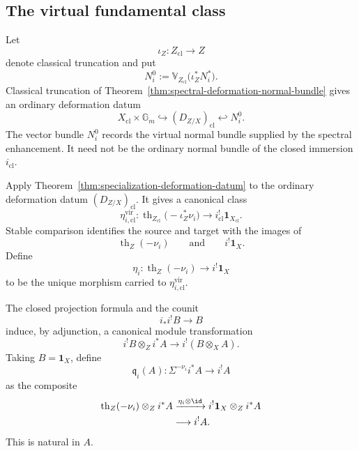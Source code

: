 \subsection{The virtual fundamental class}

Let
\[
    \iota_Z:Z_{\mathrm{cl}}\longrightarrow Z
\]
denote classical truncation and put
\[
    N_i^0
    :=
    \mathbb V_{Z_{\mathrm{cl}}}
    \bigl(
      \iota_Z^*N_i^*
    \bigr).
\]
Classical truncation of
Theorem~\ref{thm:spectral-deformation-normal-bundle} gives an ordinary
deformation datum
\[
    X_{\mathrm{cl}}\times\mathbb G_m
    \hookrightarrow
    (D_{Z/X})_{\mathrm{cl}}
    \hookleftarrow
    N_i^0.
\]
The vector bundle \(N_i^0\) records the virtual normal bundle supplied by
the spectral enhancement.  It need not be the ordinary normal bundle of the
closed immersion \(i_{\mathrm{cl}}\).

\begin{construction}
\label{constr:virtual-closed-fundamental-class}
Apply Theorem~\ref{thm:specialization-deformation-datum} to the ordinary
deformation datum \((D_{Z/X})_{\mathrm{cl}}\).  It gives a canonical class
\[
    \eta^{\mathrm{vir}}_{i,\mathrm{cl}}:
    \operatorname{th}_{Z_{\mathrm{cl}}}
    \bigl(
      -\iota_Z^*\nu_i
    \bigr)
    \longrightarrow
    i_{\mathrm{cl}}^!\mathbf1_{X_{\mathrm{cl}}}.
\]
Stable comparison identifies the source and target with the images of
\[
    \operatorname{th}_Z(-\nu_i)
    \qquad\text{and}\qquad
    i^!\mathbf1_X.
\]
Define
\[
    \eta_i:
    \operatorname{th}_Z(-\nu_i)
    \longrightarrow
    i^!\mathbf1_X
\]
to be the unique morphism carried to
\(\eta^{\mathrm{vir}}_{i,\mathrm{cl}}\).
\end{construction}

\begin{construction}
\label{constr:absolute-closed-purity-transformation}
The closed projection formula and the counit
\[
    i_*i^!B\longrightarrow B
\]
induce, by adjunction, a canonical module transformation
\[
    i^!B\otimes_Zi^*A
    \longrightarrow
    i^!(B\otimes_XA).
\]
Taking \(B=\mathbf1_X\), define
\[
    \mathfrak q_i(A):
    \Sigma^{-\nu_i}i^*A
    \longrightarrow
    i^!A
\]
as the composite
\[
\begin{aligned}
    \operatorname{th}_Z(-\nu_i)
    \otimes_Zi^*A
    &\xrightarrow{\eta_i\otimes\id}
    i^!\mathbf1_X\otimes_Zi^*A \\
    &\longrightarrow
    i^!A.
\end{aligned}
\]
This is natural in \(A\).
\end{construction}

